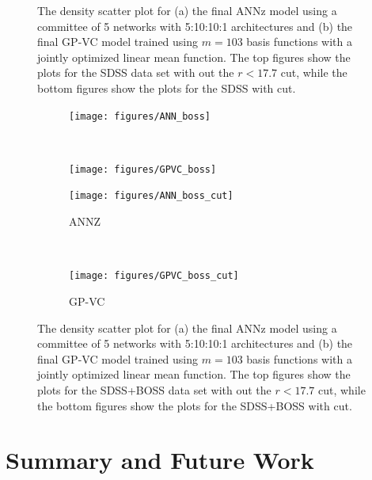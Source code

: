 \documentclass[useAMS,usenatbib,fleqn]{mn2e}
\begin{document}
\begin{figure}
        
       \caption{The density scatter plot for (a) the final {\sc ANNz} model using a committee of 5 networks with 5:10:10:1 architectures and (b) the final GP-VC model trained using $m=103$ basis functions with a jointly optimized linear mean function. The top figures show the plots for the SDSS data set with out the $r<17.7$ cut, while the bottom figures show the plots for the SDSS with cut.}
       \label{fig-final-model-sdss}
\end{figure}

\begin{figure}
        \centering
       

        \begin{subfigure}[b]{0.35\textwidth}
                \texttt{[image: figures/ANN\_boss]}
        \end{subfigure}
        ~ 
        \begin{subfigure}[b]{0.35\textwidth}
                \texttt{[image: figures/GPVC\_boss]}
        \end{subfigure}
        

        \begin{subfigure}[b]{0.35\textwidth}
                \texttt{[image: figures/ANN\_boss\_cut]}
        \caption{{\sc ANNZ}}
        \end{subfigure}
        ~ 
        \begin{subfigure}[b]{0.35\textwidth}
                \texttt{[image: figures/GPVC\_boss\_cut]}
        \caption{GP-VC}
        \end{subfigure}
        
       \caption{The density scatter plot for (a) the final {\sc ANNz} model using a committee of 5 networks with 5:10:10:1 architectures and (b) the final GP-VC model trained using $m=103$ basis functions with a jointly optimized linear mean function. The top figures show the plots for the SDSS+BOSS data set with out the $r<17.7$ cut, while the bottom figures show the plots for the SDSS+BOSS with cut. }
       \label{fig-final-model-boss}
\end{figure}

\section{Summary and Future Work}
\label{sec-summary}
\end{document}
